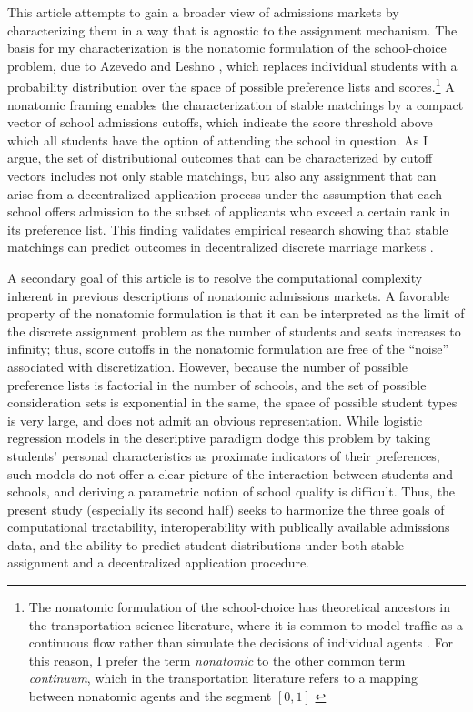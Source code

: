 \documentclass[12pt]{article}
\numberwithin{equation}{subsection}
\theoremstyle{definition}
\begin{document}
This article attempts to gain a broader view of admissions markets by characterizing them in a way that is agnostic to the assignment mechanism. The basis for my characterization is the nonatomic formulation of the school-choice problem, due to Azevedo and Leshno \parencite*{supplydemandfw}, which replaces individual students with a probability distribution over the space of possible preference lists and scores.\footnote{The nonatomic formulation of the school-choice has theoretical ancestors in the transportation science literature, where it is common to model traffic as a continuous flow rather than simulate the decisions of individual agents \parencite[][]{sometheoreticalaspectsofroadtraffic, theeconomicsofwelfare}. For this reason, I prefer the term \emph{nonatomic} to the other common term \emph{continuum}, which in the transportation literature refers to a mapping between nonatomic agents and the segment $[0,1]$ \parencite[as in][for example]{고석준thesis}} A nonatomic framing enables the characterization of stable matchings by a compact vector of school admissions cutoffs, which indicate the score threshold above which all students have the option of attending the school in question. As I argue, the set of distributional outcomes that can be characterized by cutoff vectors includes not only stable matchings, but also any assignment that can arise from a decentralized application process under the assumption that each school offers admission to the subset of applicants who exceed a certain rank in its preference list. This finding validates empirical research showing that stable matchings can predict outcomes in decentralized discrete marriage markets \parencite[][]{marryforwhat, matchingandsortinginonlinedating}. 

A secondary goal of this article is to resolve the computational complexity inherent in previous descriptions of nonatomic admissions markets. A favorable property of the nonatomic formulation is that it can be interpreted as the limit of the discrete assignment problem as the number of students and seats increases to infinity; thus, score cutoffs in the nonatomic formulation are free of the ``noise'' associated with discretization. However, because the number of possible preference lists is factorial in the number of schools, and the set of possible consideration sets is exponential in the same, the space of possible student types is very large, and does not admit an obvious representation. While logistic regression models in the descriptive paradigm dodge this problem by taking students' personal characteristics as proximate indicators of their preferences, such models do not offer a clear picture of the interaction between students and schools, and deriving a parametric notion of school quality is difficult. Thus, the present study (especially its second half) seeks to harmonize the three goals of computational tractability, interoperability with publically available admissions data, and the ability to predict student distributions under both stable assignment and a decentralized application procedure.
\end{document}
